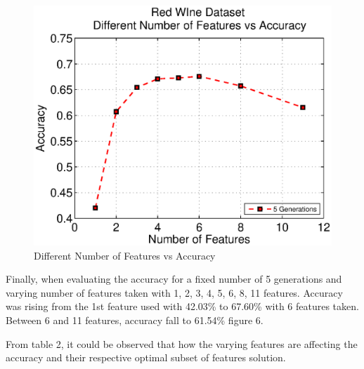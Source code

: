 \documentclass[11pt,onecolumn,a4paper]{article}
\begin{document}
      \begin{figure}[h!]
        \centering
        \includegraphics[width=0.6\linewidth]{img/winefeat2.eps}
       \caption{Different Number of Features vs Accuracy}
      \end{figure}
Finally, when evaluating the accuracy for a fixed number of 5 generations and varying number of features taken with 1, 2, 3, 4, 5, 6, 8, 11 features. Accuracy was rising from the 1st feature used with 42.03\% to 67.60\% with 6 features taken. Between 6 and 11 features, accuracy fall to 61.54\% figure 6.
   
   
   \begin{table}[t]
   \caption{Red Wine Varying Features}
   \end{table}
From table 2, it could be observed that how the varying features are affecting the accuracy and their respective optimal subset of features solution.
\end{document}
